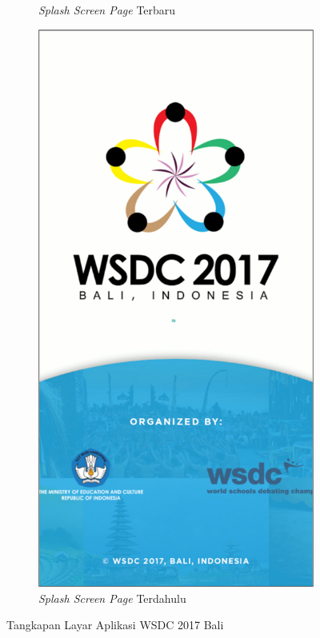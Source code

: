 \begin{figure}[H]
\begin{subfigure}[b]{0.3\textwidth}
         \caption{\textit{Splash Screen Page} Terbaru}
         \label{fig:ssSplashScreen}
     \end{subfigure}
     \hspace*{0.5in}
     \begin{subfigure}[b]{0.3\textwidth}
         \centering
         \includegraphics[width=\textwidth]{Gambar/SplashScreenOld.png}
         \caption{\textit{Splash Screen Page} Terdahulu}
         \label{fig:ssSplashScreenOld}
     \end{subfigure}
        \caption{Tangkapan Layar Aplikasi WSDC 2017 Bali}
        \label{fig:ssApk1}
\end{figure}

